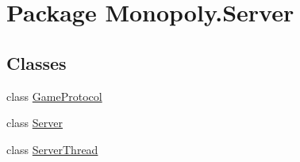 \hypertarget{namespace_monopoly_1_1_server}{}\section{Package Monopoly.\+Server}
\label{namespace_monopoly_1_1_server}
\subsection*{Classes}
\begin{DoxyCompactItemize}
\item 
class \hyperlink{class_monopoly_1_1_server_1_1_game_protocol}{Game\+Protocol}
\item 
class \hyperlink{class_monopoly_1_1_server_1_1_server}{Server}
\item 
class \hyperlink{class_monopoly_1_1_server_1_1_server_thread}{Server\+Thread}
\end{DoxyCompactItemize}
